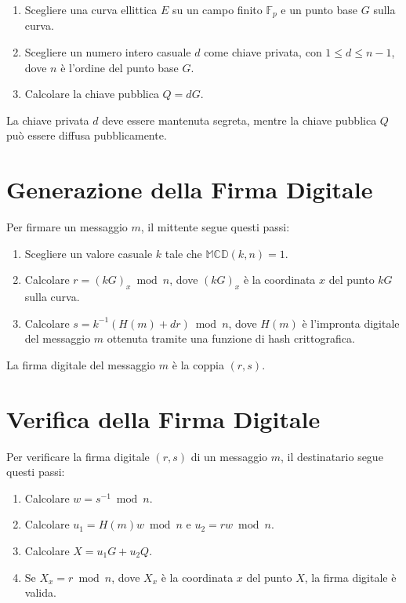 \documentclass[a4paper,12pt]{report}
\begin{document}
\begin{enumerate}
    \item Scegliere una curva ellittica $E$ su un campo finito $\mathbb{F}_p$ e un punto base $G$ sulla curva.
    \item Scegliere un numero intero casuale $d$ come chiave privata, con $1 \leq d \leq n-1$, dove $n$ è l'ordine del punto base $G$.
    \item Calcolare la chiave pubblica $Q = dG$.
\end{enumerate}

La chiave privata $d$ deve essere mantenuta segreta, mentre la chiave pubblica $Q$ può essere diffusa pubblicamente.

\section{Generazione della Firma Digitale}
Per firmare un messaggio $m$, il mittente segue questi passi:

\begin{enumerate}
    \item Scegliere un valore casuale $k$ tale che \(\mathbb{MCD}(k,n)=1\).
    \item Calcolare $r = (kG)_x \bmod n$, dove $(kG)_x$ è la coordinata $x$ del punto $kG$ sulla curva.
    \item Calcolare $s = k^{-1}(H(m) + dr) \bmod n$, dove $H(m)$ è l'impronta digitale del messaggio $m$ ottenuta tramite una funzione di hash crittografica.
\end{enumerate}

La firma digitale del messaggio $m$ è la coppia $(r, s)$.

\section{Verifica della Firma Digitale}
Per verificare la firma digitale $(r, s)$ di un messaggio $m$, il destinatario segue questi passi:

\begin{enumerate}
    \item Calcolare $w = s^{-1} \bmod n$.
    \item Calcolare $u_1 = H(m)w \bmod n$ e $u_2 = rw \bmod n$.
    \item Calcolare $X = u_1G + u_2Q$.
    \item Se $X_x = r \bmod n$, dove $X_x$ è la coordinata $x$ del punto $X$, la firma digitale è valida.
\end{enumerate}
\end{document}
